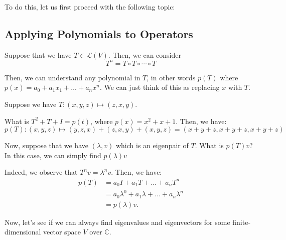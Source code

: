 \documentclass[openany]{book}
\newcommand{\CC}{\mathbb{C}}
\begin{document}
To do this, let us first proceed with the following topic:

\subsection{Applying Polynomials to Operators}
Suppose that we have $T \in \mathcal L(V)$. Then, we can consider
\begin{equation*}
	T^{n} = T \circ T \circ \cdots \circ T \tag{n times}
\end{equation*}

Then, we can understand any polynomial in $T$, in other words $p(T)$ where $p(x) = a_{0} + a_{1}x_{1} + \ldots+ a_{n}x^{n}$. We can just think of this as replacing $x$ with $T$.

\begin{example}
	Suppose we have $T : (x,y,z) \mapsto (z,x,y)$.
	
	What is $T^{2} + T + I = p(t)$, where $p(x) = x^{2} + x + 1$. Then, we have:
	\begin{equation*}
		p(T) : (x,y,z) \mapsto (y,z,x) + (z,x,y) + (x,y,z) = (x+y+z, x+y+z, x+y+z)
	\end{equation*}
\end{example}

Now, suppose that we have $(\lambda, v)$ which is an eigenpair of $T$. What is $p(T)v$? In this case, we can simply find $p(\lambda)v$

Indeed, we observe that $T^{n}v = \lambda^{n}v$. Then, we have:
\begin{align*}
	p(T) &= a_{0}I + a_{1}T + \ldots + a_{n}T^{n} \\
	&= a_{0}\lambda^{0} + a_{1}\lambda + \ldots + a_{n}\lambda^{n} \\
	&= p(\lambda)v.
\end{align*}

Now, let's see if we can always find eigenvalues and eigenvectors for some finite-dimensional vector space $V$ over $\CC$.
\end{document}
